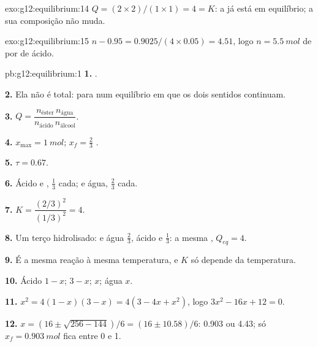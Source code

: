 \begin{solution}{exo:g12:equilibrium:14}
$Q = (2 \times 2)/(1 \times 1) = 4 = K$: a  já está em
equilíbrio; a sua composição não muda.
\end{solution}

\begin{solution}{exo:g12:equilibrium:15}
$n - 0.95 = 0.9025 / (4 \times 0.05) = 4.51$, logo $n = \qty{5.5}{mol}$
de  por  de ácido.
\end{solution}

\begin{solution}{pb:g12:equilibrium:1}
\textbf{1.} .

\textbf{2.} Ela não é total: para num equilíbrio em que os dois
sentidos continuam.

\textbf{3.} $Q = \dfrac{n_{\text{éster}}\, n_{\text{água}}}{n_{\text{ácido}}\, n_{\text{álcool}}}$.

\textbf{4.} $x_{\max} = \qty{1}{mol}$; $x_f = \frac{2}{3}$ .

\textbf{5.} $\tau = 0.67$.

\textbf{6.} Ácido e , $\frac{1}{3}$  cada;  e água,
$\frac{2}{3}$  cada.

\textbf{7.} $K = \dfrac{(2/3)^2}{(1/3)^2} = 4$.

\textbf{8.} Um terço hidrolisado:  e água $\frac{2}{3}$, ácido e
 $\frac{1}{3}$: a mesma , $Q_{eq} = 4$.

\textbf{9.} É a mesma reação à mesma temperatura, e $K$ só depende da
temperatura.

\textbf{10.} Ácido $1 - x$;  $3 - x$;  $x$; água $x$.

\textbf{11.} $x^2 = 4(1 - x)(3 - x) = 4(3 - 4x + x^2)$, logo
$3x^2 - 16x + 12 = 0$.

\textbf{12.} $x = (16 \pm \sqrt{256 - 144})/6 = (16 \pm 10.58)/6$: 0.903
ou 4.43; só $x_f = \qty{0.903}{mol}$ fica entre 0 e 1.


\end{solution}
